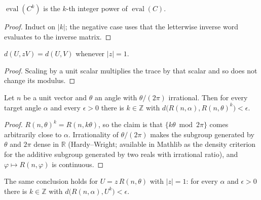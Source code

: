 \begin{lemma}
  \label{lem:zpow_eval}
  \leanok
  $\operatorname{eval}(C^{k})$ is the $k$-th integer power of
  $\operatorname{eval}(C)$.
\end{lemma}

\begin{proof}
  \leanok
  Induct on $\lvert k \rvert$; the negative case uses that the letterwise
  inverse word evaluates to the inverse matrix.
\end{proof}

\begin{lemma}
  \label{lem:hs_smul}
  \leanok
  $d(U, zV) = d(U,V)$ whenever $\lvert z\rvert = 1$.
\end{lemma}

\begin{proof}
  \leanok
  Scaling by a unit scalar multiplies the trace by that scalar and so does not
  change its modulus.
\end{proof}

\begin{lemma}[Density]
  \label{lem:dense}
  \leanok
  Let $n$ be a unit vector and $\theta$ an angle with $\theta/(2\pi)$
  irrational.  Then for every target angle $\alpha$ and every $\epsilon > 0$
  there is $k \in \mathbb{Z}$ with
  $d\big(R(n,\alpha), R(n,\theta)^{k}\big) < \epsilon$.
\end{lemma}

\begin{proof}
  \leanok
  $R(n,\theta)^k = R(n,k\theta)$, so the claim is that
  $\{k\theta \bmod 2\pi\}$ comes arbitrarily close to $\alpha$.  Irrationality
  of $\theta/(2\pi)$ makes the subgroup generated by $\theta$ and $2\pi$ dense
  in $\mathbb{R}$ (Hardy--Wright; available in Mathlib as the density criterion
  for the additive subgroup generated by two reals with irrational ratio), and
  $\varphi \mapsto R(n,\varphi)$ is continuous.
\end{proof}

\begin{lemma}
  \label{lem:dense_smul}
  \leanok
  The same conclusion holds for $U = z\,R(n,\theta)$ with
  $\lvert z\rvert = 1$: for every $\alpha$ and $\epsilon > 0$ there is
  $k \in \mathbb{Z}$ with $d\big(R(n,\alpha), U^{k}\big) < \epsilon$.
\end{lemma}


